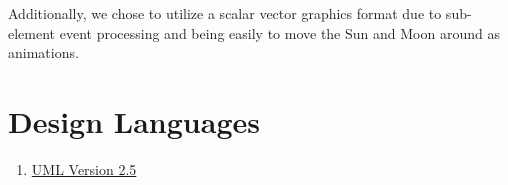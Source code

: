 \documentclass[10pt, onecolumn, draftclsnofoot, letterpaper, compsoc]{IEEEtran}
\begin{document}
Additionally, we chose to utilize a scalar vector graphics
format due to sub-element event processing and being easily
to move the Sun and Moon around as animations. \\

\section{Design Languages}

\begin{enumerate}
    \item \href{http://www.omg.org/spec/UML/2.5}{UML Version 2.5}
\end{enumerate}

\newpage



\end{document}
